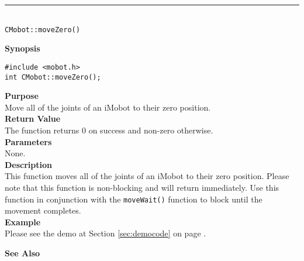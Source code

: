 \noindent
\vspace{5pt}
\rule{4.5in}{0.015in}\\
\noindent
{\LARGE \texttt{CMobot::moveZero()}}\\
{}

\noindent
{\bf Synopsis}\\
\begin{verbatim}
#include <mobot.h>
int CMobot::moveZero();
\end{verbatim}

\noindent
{\bf Purpose}\\
Move all of the joints of an iMobot to their zero position.\\

\noindent
{\bf Return Value}\\
The function returns 0 on success and non-zero otherwise.\\

\noindent
{\bf Parameters}\\
None.\\

\noindent
{\bf Description}\\
This function moves all of the joints of an iMobot to their zero position.
Please note that this function is non-blocking and will return immediately. Use
this function in conjunction with the \texttt{moveWait()} function to block
until the movement completes.\\

\noindent
{\bf Example}\\
Please see the demo at Section \ref{sec:democode} on page \pageref{sec:democode}.\\
\noindent

\noindent
{\bf See Also}\\

